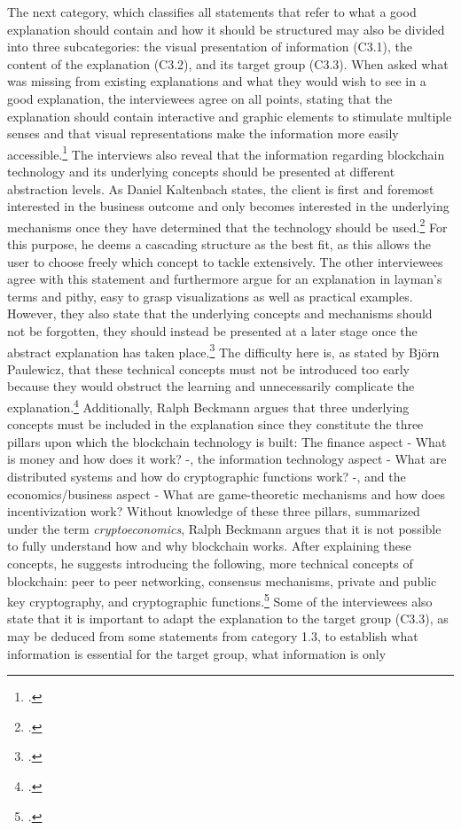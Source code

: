 The next category, which classifies all statements that refer to what a good explanation should contain and how it should be structured may also be divided into three subcategories: the visual presentation of information (C3.1), the content of the explanation (C3.2), and its target group (C3.3). When asked what was missing from existing explanations and what they would wish to see in a good explanation, the interviewees agree on all points, stating that the explanation should contain interactive and graphic elements to stimulate multiple senses and that visual representations make the information more easily accessible.\footcites[Cf.][P39, P40, P42]{DanielKaltenbach_Interview}[cf.][P82, P83, P84]{BjoernPaulewicz_Interview}[cf.][P123, P124, P134]{RalphBeckmann_Interview} The interviews also reveal that the information regarding blockchain technology and its underlying concepts should be presented at different abstraction levels. As Daniel Kaltenbach states, the client is first and foremost interested in the business outcome and only becomes interested in the underlying mechanisms once they have determined that the technology should be used.\footcites[Cf.][P29, P30, P31, P32]{DanielKaltenbach_Interview} For this purpose, he deems a cascading structure as the best fit, as this allows the user to choose freely which concept to tackle extensively. The other interviewees agree with this statement and furthermore argue for an explanation in layman's terms and pithy, easy to grasp visualizations as well as practical examples. However, they also state that the underlying concepts and mechanisms should not be forgotten, they should instead be presented at a later stage once the abstract explanation has taken place.\footcites[Cf.][P51, P52, P55, P56]{DanielKaltenbach_Interview}[cf.][P78, P85, P86]{BjoernPaulewicz_Interview}[cf.][P125, P128]{RalphBeckmann_Interview} The difficulty here is, as stated by Björn Paulewicz, that these technical concepts must not be introduced too early because they would obstruct the learning and unnecessarily complicate the explanation.\footcites[Cf.][P88, P89]{BjoernPaulewicz_Interview} Additionally, Ralph Beckmann argues that three underlying concepts must be included in the explanation since they constitute the three pillars upon which the blockchain technology is built: The finance aspect - What is money and how does it work? -, the information technology aspect - What are distributed systems and how do cryptographic functions work? -, and the economics/business aspect - What are game-theoretic mechanisms and how does incentivization work? Without knowledge of these three pillars, summarized under the term \textit{cryptoeconomics}, Ralph Beckmann argues that it is not possible to fully understand how and why blockchain works. After explaining these concepts, he suggests introducing the following, more technical concepts of blockchain: peer to peer networking, consensus mechanisms, private and public key cryptography, and cryptographic functions.\footcites[Cf.][P126, P132]{RalphBeckmann_Interview} Some of the interviewees also state that it is important to adapt the explanation to the target group (C3.3), as may be deduced from some statements from category 1.3, to establish what information is essential for the target group, what information is only 
